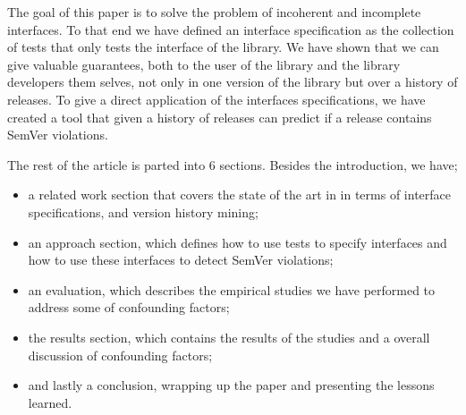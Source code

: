 The goal of this paper is to solve the problem of incoherent and
incomplete interfaces. To that end we have defined an interface specification
as the collection of tests that only tests the interface of the library. We have
shown that we can give valuable guarantees, both to the user of the library and
the library developers them selves, not only in one version of the library but 
over a history of releases. To give a direct application of the interfaces 
specifications, we have created a tool that given a history of releases can
predict if a release contains SemVer violations. 

The rest of the article is parted into 6 sections. Besides the introduction, we
have; 
\begin{itemize}

    \item a related work section that covers the state of the art in in terms
    of interface specifications, and version history mining; 

    \item an approach section, which defines how to use tests to specify
    interfaces and how to use these interfaces to detect SemVer violations;

    \item an evaluation, which describes the empirical studies we have
    performed to address some of confounding factors;

    \item the results section, which contains the results of the studies and a
    overall discussion of confounding factors;

    \item and lastly a conclusion, wrapping up the paper and presenting the
    lessons learned.

\end{itemize}

%

